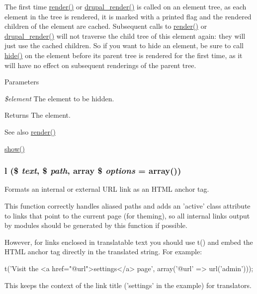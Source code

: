 The first time \hyperlink{common_8inc_a5f4b2009c1caf78549203cec9b324305}{render()} or \hyperlink{common_8inc_a05798b44e8d6c496d4bee5cc32fa7851}{drupal\_\-render()} is called on an element tree, as each element in the tree is rendered, it is marked with a printed flag and the rendered children of the element are cached. Subsequent calls to \hyperlink{common_8inc_a5f4b2009c1caf78549203cec9b324305}{render()} or \hyperlink{common_8inc_a05798b44e8d6c496d4bee5cc32fa7851}{drupal\_\-render()} will not traverse the child tree of this element again: they will just use the cached children. So if you want to hide an element, be sure to call \hyperlink{common_8inc_aa57f04b6e1f5cdc3ed30abf98fd0fd3f}{hide()} on the element before its parent tree is rendered for the first time, as it will have no effect on subsequent renderings of the parent tree.


\begin{DoxyParams}{Parameters}
\item[{\em \$element}]The element to be hidden.\end{DoxyParams}
\begin{DoxyReturn}{Returns}
The element.
\end{DoxyReturn}
\begin{DoxySeeAlso}{See also}
\hyperlink{common_8inc_a5f4b2009c1caf78549203cec9b324305}{render()} 

\hyperlink{common_8inc_a5118f0601a3243a2d651369892b6cd47}{show()} 
\end{DoxySeeAlso}
\hypertarget{common_8inc_ad3b36c06dc46250b8d22b8d0d2e7bd97}{
\subsubsection[{l}]{\setlength{\rightskip}{0pt plus 5cm}l (\$ {\em text}, \/  \$ {\em path}, \/  array \$ {\em options} = {\ttfamily array()})}}
\label{common_8inc_ad3b36c06dc46250b8d22b8d0d2e7bd97}
Formats an internal or external URL link as an HTML anchor tag.

This function correctly handles aliased paths and adds an 'active' class attribute to links that point to the current page (for theming), so all internal links output by modules should be generated by this function if possible.

However, for links enclosed in translatable text you should use t() and embed the HTML anchor tag directly in the translated string. For example: 
\begin{DoxyCode}
 t('Visit the <a href="@url">settings</a> page', array('@url' => url('admin')));
\end{DoxyCode}
 This keeps the context of the link title ('settings' in the example) for translators.


